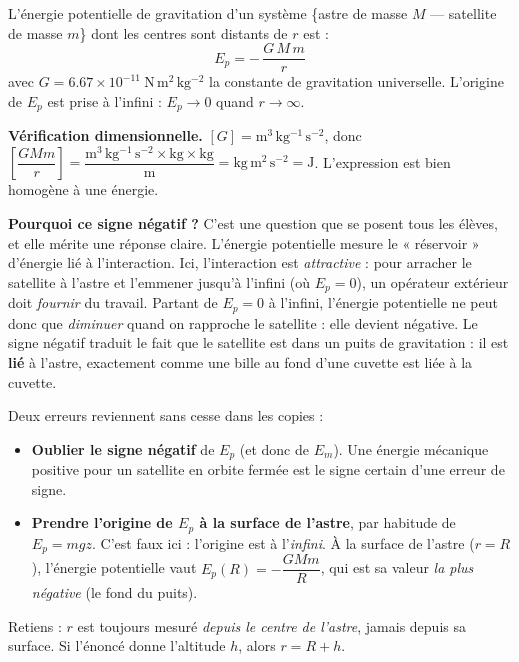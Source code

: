 \documentclass[11pt]{article}
\newcommand{\cle}[1]{{\popxbold\color{popdark}#1}}
\begin{document}
\begin{definition}
L'énergie potentielle de gravitation d'un système \{astre de masse $M$ — satellite de masse $m$\} dont les centres sont distants de $r$ est :
\[ \boxed{E_p = -\,\dfrac{G\,M\,m}{r}} \]
avec $G = \num{6,67}\times 10^{-11}\ \mathrm{N\,m^2\,kg^{-2}}$ la constante de gravitation universelle. L'origine de $E_p$ est prise à l'infini : $E_p \to 0$ quand $r \to \infty$.
\end{definition}

\textbf{Vérification dimensionnelle.} $[G] = \mathrm{m^3\,kg^{-1}\,s^{-2}}$, donc $\left[\dfrac{GMm}{r}\right] = \dfrac{\mathrm{m^3\,kg^{-1}\,s^{-2}}\times \mathrm{kg}\times \mathrm{kg}}{\mathrm{m}} = \mathrm{kg\,m^2\,s^{-2}} = \mathrm{J}$. L'expression est bien homogène à une énergie.

\textbf{Pourquoi ce signe négatif ?} C'est une question que se posent tous les élèves, et elle mérite une réponse claire. L'énergie potentielle mesure le « réservoir » d'énergie lié à l'interaction. Ici, l'interaction est \emph{attractive} : pour arracher le satellite à l'astre et l'emmener jusqu'à l'infini (où $E_p = 0$), un opérateur extérieur doit \emph{fournir} du travail. Partant de $E_p = 0$ à l'infini, l'énergie potentielle ne peut donc que \emph{diminuer} quand on rapproche le satellite : elle devient négative. Le signe négatif traduit le fait que le satellite est dans un \cle{puits de gravitation} : il est \textbf{lié} à l'astre, exactement comme une bille au fond d'une cuvette est liée à la cuvette.

\begin{attention}
Deux erreurs reviennent sans cesse dans les copies :
\begin{itemize}
\item \textbf{Oublier le signe négatif} de $E_p$ (et donc de $E_m$). Une énergie mécanique positive pour un satellite en orbite fermée est le signe certain d'une erreur de signe.
\item \textbf{Prendre l'origine de $E_p$ à la surface de l'astre}, par habitude de $E_p = mgz$. C'est faux ici : l'origine est à l'\emph{infini}. À la surface de l'astre ($r = R$), l'énergie potentielle vaut $E_p(R) = -\dfrac{GMm}{R}$, qui est sa valeur \emph{la plus négative} (le fond du puits).
\end{itemize}
Retiens : $r$ est toujours mesuré \emph{depuis le centre de l'astre}, jamais depuis sa surface. Si l'énoncé donne l'altitude $h$, alors $r = R + h$.
\end{attention}
\end{document}
